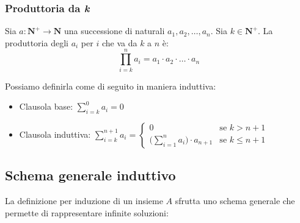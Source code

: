 \subsubsection{Produttoria da \emph{k}}
\begin{definition}
	Sia $a:\mathbf{N}^+ \rightarrow \mathbf{N}$ una successione di naturali $a_1, a_2, \ldots, a_n$. Sia $k \in \mathbf{N}^+$. La produttoria degli $a_i$ per $i$ che va da $k$ a $n$ è:
	\begin{equation}
		\prod\limits_{i=k}^n a_i = a_1 \cdot a_2 \cdot \ldots \cdot a_n
	\end{equation}
\end{definition}
Possiamo definirla come di seguito in maniera induttiva:
\begin{itemize}
	\item Clausola base: $\sum\limits_{i=k}^0 a_i = 0$
	\item Clausola induttiva: $\sum\limits_{i=k}^{n+1} a_i = \begin{cases}
		0 & \text{se } k>n+1 \\
		\bigg(\sum\limits_{i=1}^n a_i) \cdot a_{n+1} & \text{se } k \leq n+1
	\end{cases}$
\end{itemize}


\subsection{Schema generale induttivo}
La definizione per induzione di un insieme $A$ sfrutta uno schema generale che permette di rappresentare infinite soluzioni:

